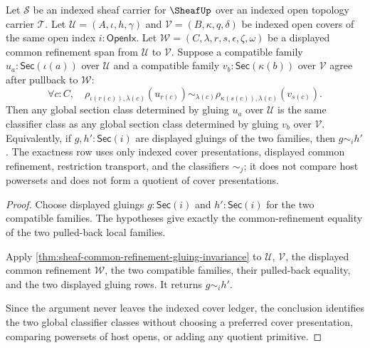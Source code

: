 \begin{theorem}
\label{thm:sheaf-cover-presentation-exactness}
Let $\mathcal{S}$ be an indexed sheaf carrier for $\SheafUp$ over an indexed open topology carrier $\mathcal{T}$. Let $\mathcal{U}=(A,\iota,h,\gamma)$ and $\mathcal{V}=(B,\kappa,q,\delta)$ be indexed open covers of the same open index $i:\mathsf{OpenIx}$. Let $\mathcal{W}=(C,\lambda,r,s,\epsilon,\zeta,\omega)$ be a displayed common refinement span from $\mathcal{U}$ to $\mathcal{V}$. Suppose a compatible family $u_a:\mathsf{Sec}(\iota(a))$ over $\mathcal{U}$ and a compatible family $v_b:\mathsf{Sec}(\kappa(b))$ over $\mathcal{V}$ agree after pullback to $\mathcal{W}$:
$$
\forall c:C,\quad
\rho_{\iota(r(c)),\lambda(c)}(u_{r(c)})
\sim_{\lambda(c)}
\rho_{\kappa(s(c)),\lambda(c)}(v_{s(c)}).
$$
Then any global section class determined by gluing $u_a$ over $\mathcal{U}$ is the same classifier class as any global section class determined by gluing $v_b$ over $\mathcal{V}$. Equivalently, if $g,h':\mathsf{Sec}(i)$ are displayed gluings of the two families, then $g\sim_i h'$. The exactness row uses only indexed cover presentations, displayed common refinement, restriction transport, and the classifiers $\sim_j$; it does not compare host powersets and does not form a quotient of cover presentations.
\end{theorem}
\begin{proof}
Choose displayed gluings $g:\mathsf{Sec}(i)$ and $h':\mathsf{Sec}(i)$ for the two compatible families. The hypotheses give exactly the common-refinement equality of the two pulled-back local families.

Apply \autoref{thm:sheaf-common-refinement-gluing-invariance} to $\mathcal{U}$, $\mathcal{V}$, the displayed common refinement $\mathcal{W}$, the two compatible families, their pulled-back equality, and the two displayed gluing rows. It returns $g\sim_i h'$.

Since the argument never leaves the indexed cover ledger, the conclusion identifies the two global classifier classes without choosing a preferred cover presentation, comparing powersets of host opens, or adding any quotient primitive.
\end{proof}

